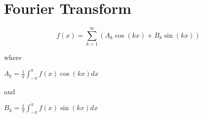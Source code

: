 \chapter{Fourier Transform}

\begin{definition}
\[
        f(x) = \sum_{k=1}^{\infty}   (A_k \cos (kx)+B_k \sin (kx))
\]
\end{definition}
where
\begin{definition}
    \(
    A_k = \frac{1}{\pi} \int_{-\pi} ^\pi f(x) \cos (kx) dx
    \)
\end{definition}
and
\begin{definition}
    \(
        B_k = \frac{1}{\pi }\int_{-\pi} ^\pi f(x) \sin(kx) dx
    \)
\end{definition}

